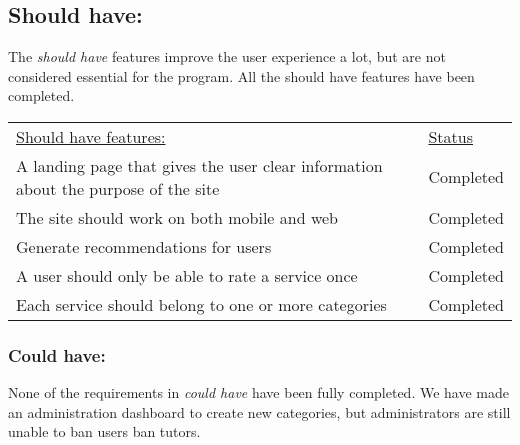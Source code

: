 \subsection{Should have:}
The \textit{should have} features improve the user experience a lot, but are not considered essential for the program.
All the should have features have been completed.

\begin{table}[h]
    \begin{tabularx}{\textwidth}{|X|l|}
    \underline{Should have features:}                                                                 & \underline{Status} \\
    A landing page that gives the user clear information about the purpose of the site                & Completed \\
    The site should work on both mobile and web                                                       & Completed \\
    Generate recommendations for users                                                                & Completed \\
    A user should only be able to rate a service once                                                 & Completed \\
    Each service should belong to one or more categories                                              & Completed \\
   \end{tabularx}
\end{table}

\subsubsection{Could have:}
None of the requirements in \textit{could have} have been fully completed.
We have made an administration dashboard to create new categories, but administrators are still unable to ban users ban tutors.

